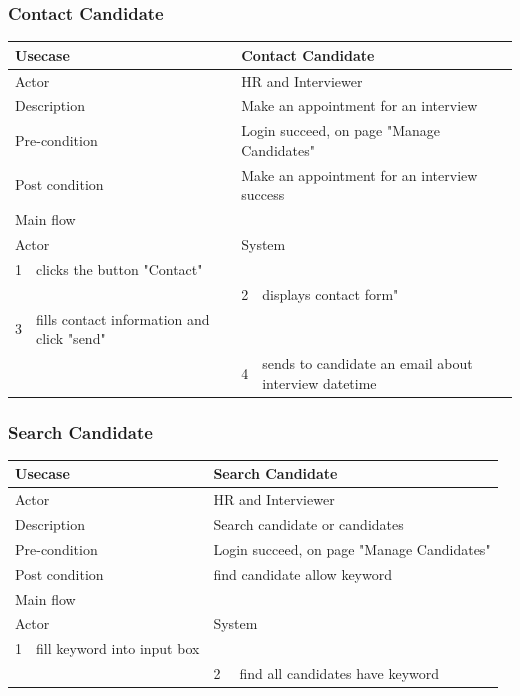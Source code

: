 \documentclass[a4paper]{article}
\begin{document}
\subsubsection{Contact Candidate}
\begin{tabular}{|l|p{5cm}||l|p{5cm}|}
	\hline 
	\multicolumn{2}{|p{5cm}|}{Usecase} & \multicolumn{2}{|p{5cm}|}{Contact Candidate}\\ 
	\hline 
	\multicolumn{2}{|p{5cm}|}{Actor} & \multicolumn{2}{|p{5cm}|}{HR and Interviewer} \\ 
	\hline 
	\multicolumn{2}{|p{5cm}|}{Description} & \multicolumn{2}{|p{5cm}|}{Make an appointment for an interview}\\
	\hline
	\multicolumn{2}{|p{5cm}|}{Pre-condition} & \multicolumn{2}{|p{5cm}|}{Login succeed, on page "Manage Candidates"}\\
	\hline
	\multicolumn{2}{|p{5cm}|}{Post condition} & \multicolumn{2}{|p{5cm}|}{Make an appointment for an interview success} \\
	\hline
	\multicolumn{4}{|l|}{Main flow} \\
	\hline
	\multicolumn{2}{|p{5cm}|}{Actor} & \multicolumn{2}{|p{5cm}|}{System} \\
	\hline
	1 & clicks the button "Contact" & & \\
	\hline
	& & 2 & displays contact form" \\
	\hline 
	3 & fills contact information and click "send" &  &  \\
	\hline
	& & 4 & sends to candidate an email about interview datetime \\
	\hline
\end{tabular}
\subsubsection{Search Candidate}
\begin{tabular}{|l|p{5cm}||l|p{5cm}|}
	\hline 
	\multicolumn{2}{|p{5cm}|}{Usecase} & \multicolumn{2}{|p{5cm}|}{Search Candidate}\\ 
	\hline 
	\multicolumn{2}{|p{5cm}|}{Actor} & \multicolumn{2}{|p{5cm}|}{HR and Interviewer} \\ 
	\hline 
	\multicolumn{2}{|p{5cm}|}{Description} & \multicolumn{2}{|p{5cm}|}{Search candidate or candidates}\\
	\hline
	\multicolumn{2}{|p{5cm}|}{Pre-condition} & \multicolumn{2}{|p{5cm}|}{Login succeed, on page "Manage Candidates"}\\
	\hline
	\multicolumn{2}{|p{5cm}|}{Post condition} & \multicolumn{2}{|p{5cm}|}{find candidate allow keyword} \\
	\hline
	\multicolumn{4}{|l|}{Main flow} \\
	\hline
	\multicolumn{2}{|p{5cm}|}{Actor} & \multicolumn{2}{|p{5cm}|}{System} \\
	\hline
	1 & fill keyword into input box & & \\
	\hline
	& & 2 & find all candidates have keyword  \\
	\hline 
\end{tabular}
\end{document}

